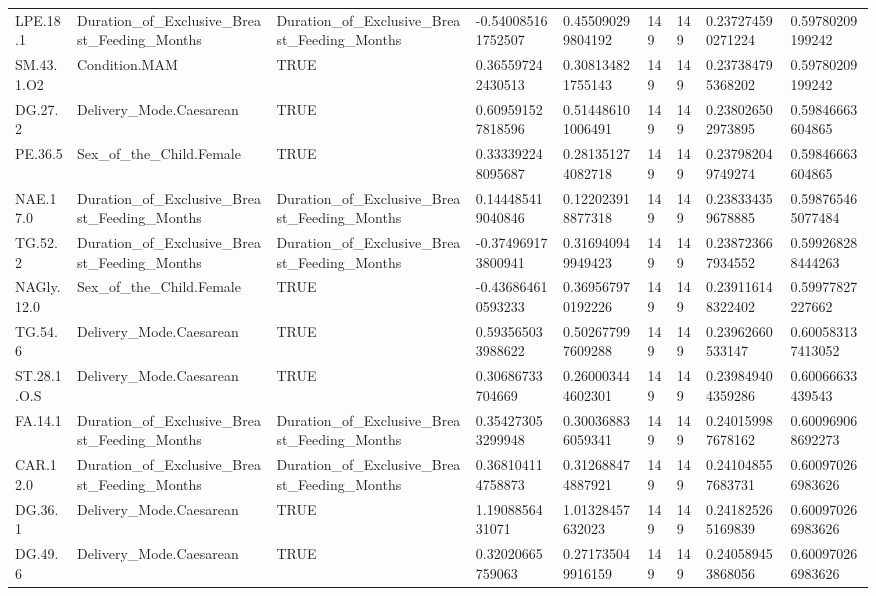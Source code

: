 \begin{longtable}{lllllllll}
LPE.18.1 & Duration\_of\_Exclusive\_Breast\_Feeding\_Months & Duration\_of\_Exclusive\_Breast\_Feeding\_Months & -0.540085161752507 & 0.455090299804192 & 149 & 149 & 0.237274590271224 & 0.59780209199242 \\
SM.43.1.O2 & Condition.MAM & TRUE & 0.365597242430513 & 0.308134821755143 & 149 & 149 & 0.237384795368202 & 0.59780209199242 \\
DG.27.2 & Delivery\_Mode.Caesarean & TRUE & 0.609591527818596 & 0.514486101006491 & 149 & 149 & 0.238026502973895 & 0.59846663604865 \\
PE.36.5 & Sex\_of\_the\_Child.Female & TRUE & 0.333392248095687 & 0.281351274082718 & 149 & 149 & 0.237982049749274 & 0.59846663604865 \\
NAE.17.0 & Duration\_of\_Exclusive\_Breast\_Feeding\_Months & Duration\_of\_Exclusive\_Breast\_Feeding\_Months & 0.144485419040846 & 0.122023918877318 & 149 & 149 & 0.238334359678885 & 0.598765465077484 \\
TG.52.2 & Duration\_of\_Exclusive\_Breast\_Feeding\_Months & Duration\_of\_Exclusive\_Breast\_Feeding\_Months & -0.374969173800941 & 0.316940949949423 & 149 & 149 & 0.238723667934552 & 0.599268288444263 \\
NAGly.12.0 & Sex\_of\_the\_Child.Female & TRUE & -0.436864610593233 & 0.369567970192226 & 149 & 149 & 0.239116148322402 & 0.59977827227662 \\
TG.54.6 & Delivery\_Mode.Caesarean & TRUE & 0.593565033988622 & 0.502677997609288 & 149 & 149 & 0.23962660533147 & 0.600583137413052 \\
ST.28.1.O.S & Delivery\_Mode.Caesarean & TRUE & 0.30686733704669 & 0.260003444602301 & 149 & 149 & 0.239849404359286 & 0.60066633439543 \\
FA.14.1 & Duration\_of\_Exclusive\_Breast\_Feeding\_Months & Duration\_of\_Exclusive\_Breast\_Feeding\_Months & 0.354273053299948 & 0.300368836059341 & 149 & 149 & 0.240159987678162 & 0.600969068692273 \\
CAR.12.0 & Duration\_of\_Exclusive\_Breast\_Feeding\_Months & Duration\_of\_Exclusive\_Breast\_Feeding\_Months & 0.368104114758873 & 0.312688474887921 & 149 & 149 & 0.241048557683731 & 0.600970266983626 \\
DG.36.1 & Delivery\_Mode.Caesarean & TRUE & 1.1908856431071 & 1.01328457632023 & 149 & 149 & 0.241825265169839 & 0.600970266983626 \\
DG.49.6 & Delivery\_Mode.Caesarean & TRUE & 0.32020665759063 & 0.271735049916159 & 149 & 149 & 0.240589453868056 & 0.600970266983626 \\

\end{longtable}
